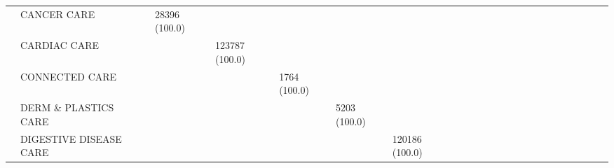 \begin{tabular}{llllllllllllllllllllllll}
                                       & CANCER CARE &                             &     28396 (100.0) &                    &                   &                      &                        &                     &                     &                     &                     &                    &                             &                   &                      &                                  &                    &                    &                    &                   &                       &                     &                    \\
                                       & CARDIAC CARE &                             &                   &     123787 (100.0) &                   &                      &                        &                     &                     &                     &                     &                    &                             &                   &                      &                                  &                    &                    &                    &                   &                       &                     &                    \\
                                       & CONNECTED CARE &                             &                   &                    &      1764 (100.0) &                      &                        &                     &                     &                     &                     &                    &                             &                   &                      &                                  &                    &                    &                    &                   &                       &                     &                    \\
                                       & DERM \& PLASTICS CARE &                             &                   &                    &                   &         5203 (100.0) &                        &                     &                     &                     &                     &                    &                             &                   &                      &                                  &                    &                    &                    &                   &                       &                     &                    \\
                                       & DIGESTIVE DISEASE CARE &                             &                   &                    &                   &                      &         120186 (100.0) &                     &                     &                     &                     &                    &                             &                   &                      &                                  &                    &                    &                    &                   &                       &                     &                    \\

\end{tabular}
